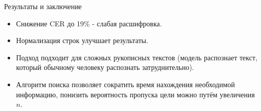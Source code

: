 \documentclass{beamer}
\begin{document}
\begin{frame}{Результаты и заключение}
    \begin{itemize}
        \item Снижение CER до 19\% - слабая расшифровка.
        \item Нормализация строк улучшает результаты.
        \item Подход подходит для сложных рукописных текстов (модель распознает текст, который обычному человеку распознать затруднительно).
        \item Алгоритм поиска позволяет сократить время нахождения необходимой информацию, понизить вероятность пропуска цели можно путём увеличения $n$.
    \end{itemize}
\end{frame}
\end{document}
